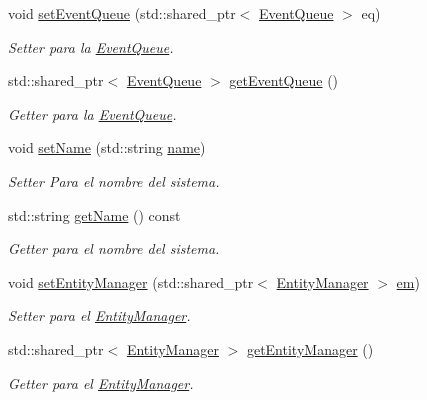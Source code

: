 \begin{DoxyCompactItemize}
void \hyperlink{classant_1_1_system_a1effe9f0e5615e516a34be02d5895434}{set\+Event\+Queue} (std\+::shared\+\_\+ptr$<$ \hyperlink{classant_1_1_event_queue}{Event\+Queue} $>$ eq)
\begin{DoxyCompactList}\small\item\em Setter para la \hyperlink{classant_1_1_event_queue}{Event\+Queue}. \end{DoxyCompactList}\item 
std\+::shared\+\_\+ptr$<$ \hyperlink{classant_1_1_event_queue}{Event\+Queue} $>$ \hyperlink{classant_1_1_system_ac3e2bbbdb622276d194ad3a687d8e4f1}{get\+Event\+Queue} ()
\begin{DoxyCompactList}\small\item\em Getter para la \hyperlink{classant_1_1_event_queue}{Event\+Queue}. \end{DoxyCompactList}\item 
void \hyperlink{classant_1_1_system_a231f9fc93b55ee67deb9597ae6be13ba}{set\+Name} (std\+::string \hyperlink{classant_1_1_system_a60b3c00a760a3b4947ab1f1fc534a5b2}{name})
\begin{DoxyCompactList}\small\item\em Setter Para el nombre del sistema. \end{DoxyCompactList}\item 
std\+::string \hyperlink{classant_1_1_system_a52a559b2c3ddbec5c846df1badd7f7f8}{get\+Name} () const 
\begin{DoxyCompactList}\small\item\em Getter para el nombre del sistema. \end{DoxyCompactList}\item 
void \hyperlink{classant_1_1_system_a1f983382d142ea697f1811f7f6f6ab17}{set\+Entity\+Manager} (std\+::shared\+\_\+ptr$<$ \hyperlink{classant_1_1_entity_manager}{Entity\+Manager} $>$ \hyperlink{classant_1_1_system_a5661d872ff769be150bd4e9a9552f6b9}{em})
\begin{DoxyCompactList}\small\item\em Setter para el \hyperlink{classant_1_1_entity_manager}{Entity\+Manager}. \end{DoxyCompactList}\item 
std\+::shared\+\_\+ptr$<$ \hyperlink{classant_1_1_entity_manager}{Entity\+Manager} $>$ \hyperlink{classant_1_1_system_adaad2087de7fc71924cfb5b134014b0a}{get\+Entity\+Manager} ()
\begin{DoxyCompactList}\small\item\em Getter para el \hyperlink{classant_1_1_entity_manager}{Entity\+Manager}. \end{DoxyCompactList}\end{DoxyCompactItemize}
